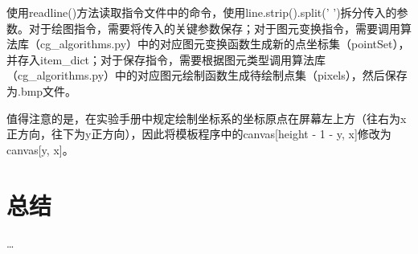 \documentclass[a4paper,UTF8]{article}
\theoremstyle{definition}
\begin{document}
使用readline()方法读取指令文件中的命令，使用line.strip().split(' ')拆分传入的参数。对于绘图指令，需要将传入的关键参数保存；对于图元变换指令，需要调用算法库（cg\_algorithms.py）中的对应图元变换函数生成新的点坐标集（pointSet），并存入item\_dict；对于保存指令，需要根据图元类型调用算法库（cg\_algorithms.py）中的对应图元绘制函数生成待绘制点集（pixels），然后保存为.bmp文件。

值得注意的是，在实验手册中规定绘制坐标系的坐标原点在屏幕左上方（往右为x正方向，往下为y正方向），因此将模板程序中的canvas[height - 1 - y, x]修改为canvas[y, x]。

\section{总结}
\dots

%

\end{document}

